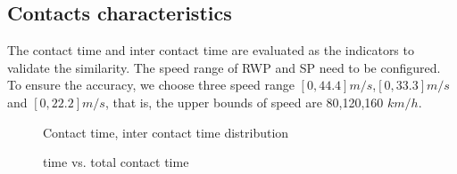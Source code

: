 \subsection{Contacts characteristics}

The contact time and inter contact time are evaluated as the indicators to validate the similarity. The speed range of RWP and SP need to be configured. To ensure the accuracy, we choose three speed range $[0,44.4]m/s$,$[0,33.3]m/s$ and $[0,22.2]m/s$, that is, the upper bounds of speed are 80,120,160 $km/h$.


\begin{figure}
\centering
{}
\caption{Contact time, inter contact time distribution}\label{figure_contacts}
\end{figure}


\begin{figure}
\centering
{}
\caption{time vs. total contact time}\label{figure_total_contact_time}
\end{figure}

